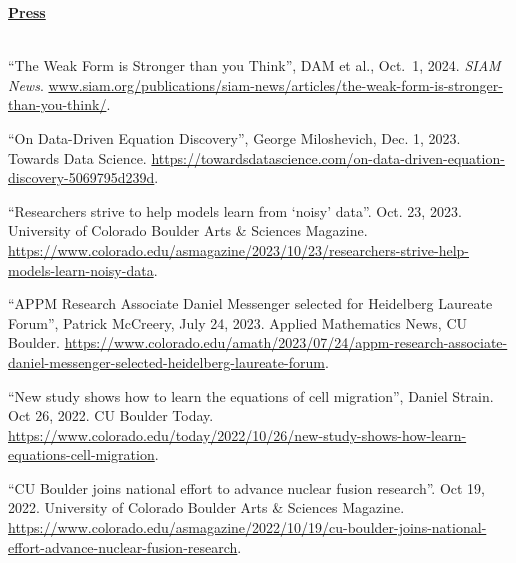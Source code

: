 \documentclass[letterpaper,11pt,oneside]{article}
\newcommand{\headr}[1]{\vspace{10pt}\uline{\Large{\textbf{#1}} \hfill } \\ \vspace{-10pt}\\}
\begin{document}
\headr{Press}
\vspace{-0.5cm}
\begin{sloppypar}
\begin{enumerate}[label={[\arabic*]}]
\item 
\raggedright``The Weak Form is Stronger than you Think'', DAM et al., Oct.\ 1, 2024. {\it SIAM News}. {\footnotesize\url{www.siam.org/publications/siam-news/articles/the-weak-form-is-stronger-than-you-think/}}.
\item 
\raggedright``On Data-Driven Equation Discovery'', George Miloshevich, Dec. 1, 2023. Towards Data Science. {\footnotesize\url{https://towardsdatascience.com/on-data-driven-equation-discovery-5069795d239d}}.
\item 
\raggedright``Researchers strive to help models learn from ‘noisy’ data''. Oct. 23, 2023. University of Colorado Boulder Arts \& Sciences Magazine. {\footnotesize\url{https://www.colorado.edu/asmagazine/2023/10/23/researchers-strive-help-models-learn-noisy-data}}.
\item 
\raggedright``APPM Research Associate Daniel Messenger selected for Heidelberg Laureate Forum'', Patrick McCreery, July 24, 2023. Applied Mathematics News, CU Boulder. {\footnotesize\url{https://www.colorado.edu/amath/2023/07/24/appm-research-associate-daniel-messenger-selected-heidelberg-laureate-forum}}.
\item \raggedright``New study shows how to learn the equations of cell migration'', Daniel Strain. Oct 26, 2022. CU Boulder Today. {\footnotesize\url{https://www.colorado.edu/today/2022/10/26/new-study-shows-how-learn-equations-cell-migration}}.
\item 
\raggedright``CU Boulder joins national effort to advance nuclear fusion research''. Oct 19, 2022. University of Colorado Boulder Arts \& Sciences Magazine. {\footnotesize\url{https://www.colorado.edu/asmagazine/2022/10/19/cu-boulder-joins-national-effort-advance-nuclear-fusion-research}}.
\end{enumerate}
\end{sloppypar}
\end{document}
